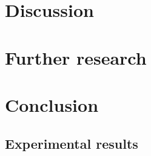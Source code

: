 \documentclass[a4paper,12pt,titlepage,oneside,openany]{book}
\begin{document}
\chapter{Discussion}
\label{ch:discussion}


\chapter{Further research}
\label{ch:further}


\chapter{Conclusion}
\label{ch:conclusion}


\begingroup
    \setlength{\bibsep}{4pt}
    \singlespacing
    
\endgroup

\begin{appendices}


    \chapter{Experimental results}
    \label{ch:results_tables}
    

\end{appendices}

\resetpath

\cleardoublepage

\restoregeometry



\cleardoublepage
\begin{titlepage}

\end{titlepage}

\cleardoublepage
\begin{titlepage}

\end{titlepage}
\end{document}
